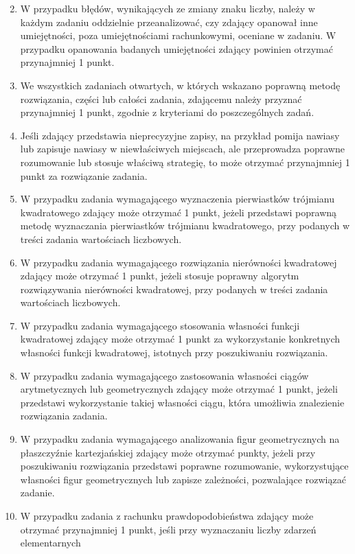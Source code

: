 \documentclass[10pt]{article}
\begin{document}
\begin{enumerate}
  \setcounter{enumi}{1}
  \item W przypadku błędów, wynikających ze zmiany znaku liczby, należy w każdym zadaniu oddzielnie przeanalizować, czy zdający opanował inne umiejętności, poza umiejętnościami rachunkowymi, oceniane w zadaniu. W przypadku opanowania badanych umiejętności zdający powinien otrzymać przynajmniej 1 punkt.
  \item We wszystkich zadaniach otwartych, w których wskazano poprawną metodę rozwiązania, części lub całości zadania, zdającemu należy przyznać przynajmniej 1 punkt, zgodnie z kryteriami do poszczególnych zadań.
  \item Jeśli zdający przedstawia nieprecyzyjne zapisy, na przykład pomija nawiasy lub zapisuje nawiasy w niewłaściwych miejscach, ale przeprowadza poprawne rozumowanie lub stosuje właściwą strategię, to może otrzymać przynajmniej 1 punkt za rozwiązanie zadania.
  \item W przypadku zadania wymagającego wyznaczenia pierwiastków trójmianu kwadratowego zdający może otrzymać 1 punkt, jeżeli przedstawi poprawną metodę wyznaczania pierwiastków trójmianu kwadratowego, przy podanych w treści zadania wartościach liczbowych.
  \item W przypadku zadania wymagającego rozwiązania nierówności kwadratowej zdający może otrzymać 1 punkt, jeżeli stosuje poprawny algorytm rozwiązywania nierówności kwadratowej, przy podanych w treści zadania wartościach liczbowych.
  \item W przypadku zadania wymagającego stosowania własności funkcji kwadratowej zdający może otrzymać 1 punkt za wykorzystanie konkretnych własności funkcji kwadratowej, istotnych przy poszukiwaniu rozwiązania.
  \item W przypadku zadania wymagającego zastosowania własności ciągów arytmetycznych lub geometrycznych zdający może otrzymać 1 punkt, jeżeli przedstawi wykorzystanie takiej własności ciągu, która umożliwia znalezienie rozwiązania zadania.
  \item W przypadku zadania wymagającego analizowania figur geometrycznych na płaszczyźnie kartezjańskiej zdający może otrzymać punkty, jeżeli przy poszukiwaniu rozwiązania przedstawi poprawne rozumowanie, wykorzystujące własności figur geometrycznych lub zapisze zależności, pozwalające rozwiązać zadanie.
  \item W przypadku zadania z rachunku prawdopodobieństwa zdający może otrzymać przynajmniej 1 punkt, jeśli przy wyznaczaniu liczby zdarzeń elementarnych\\

\end{enumerate}
\end{document}
